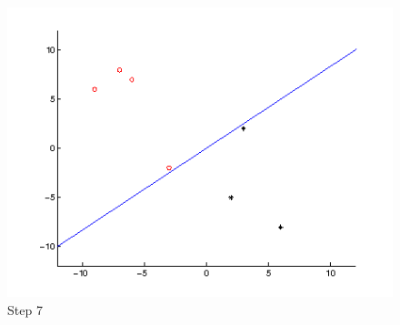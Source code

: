 \begin{figure}
\centering{}\includegraphics[width=1\textwidth]{plots/6_7}\caption{Step 7}
\end{figure}

